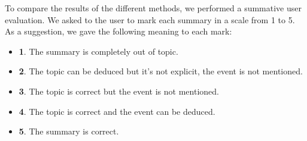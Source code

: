To compare the results of the different methods, we performed a summative user evaluation. We asked to the user to mark each summary in a scale from 1 to 5. As a suggestion, we gave the following meaning to each mark:
\begin{itemize}
\item \textbf{1}. The summary is completely out of topic.
\item \textbf{2}. The topic can be deduced but it's not explicit, the event is not mentioned.
\item \textbf{3}. The topic is correct but the event is not mentioned.
\item \textbf{4}. The topic is correct and the event can be deduced.
\item \textbf{5}. The summary is correct.
\end{itemize}

